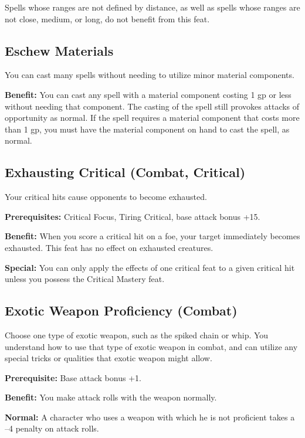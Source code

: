 Spells whose ranges are not defined by distance, as well as spells whose ranges are not close, medium, or long, do not benefit from this feat.
				
\subsection{Eschew Materials}

				
You can cast many spells without needing to utilize minor material components.
				
\textbf{Benefit:} You can cast any spell with a material component costing 1 gp or less without needing that component. The casting of the spell still provokes attacks of opportunity as normal. If the spell requires a material component that costs more than 1 gp, you must have the material component on hand to cast the spell, as normal.
				
\subsection{Exhausting Critical (Combat, Critical)}

				
Your critical hits cause opponents to become exhausted.
				
\textbf{Prerequisites:} Critical Focus, Tiring Critical, base attack bonus +15.
				
\textbf{Benefit:} When you score a critical hit on a foe, your target immediately becomes exhausted. This feat has no effect on exhausted creatures.
				
\textbf{Special:} You can only apply the effects of one critical feat to a given critical hit unless you possess the Critical Mastery feat.
				
\subsection{Exotic Weapon Proficiency (Combat)}

				
Choose one type of exotic weapon, such as the spiked chain or whip. You understand how to use that type of exotic weapon in combat, and can utilize any special tricks or qualities that exotic weapon might allow.
				
\textbf{Prerequisite:} Base attack bonus +1.
				
\textbf{Benefit:} You make attack rolls with the weapon normally.
				
\textbf{Normal:} A character who uses a weapon with which he is not proficient takes a --4 penalty on attack rolls.
				
